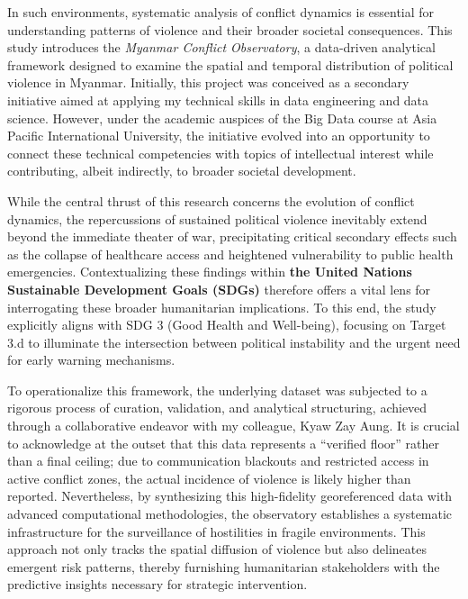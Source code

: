 \documentclass[conference]{IEEEtran}
\begin{document}
In such environments, systematic analysis of conflict dynamics is essential for understanding patterns of violence and their broader societal consequences. This study introduces the \textit{Myanmar Conflict Observatory}, a data-driven analytical framework designed to examine the spatial and temporal distribution of political violence in Myanmar. Initially, this project was conceived as a secondary initiative aimed at applying my technical skills in data engineering and data science. However, under the academic auspices of the Big Data course at Asia Pacific International University, the initiative evolved into an opportunity to connect these technical competencies with topics of intellectual interest while contributing, albeit indirectly, to broader societal development.

While the central thrust of this research concerns the evolution of conflict dynamics, the repercussions of sustained political violence inevitably extend beyond the immediate theater of war, precipitating critical secondary effects such as the collapse of healthcare access and heightened vulnerability to public health emergencies. Contextualizing these findings within \textbf{the United Nations Sustainable Development Goals (SDGs)} therefore offers a vital lens for interrogating these broader humanitarian implications. To this end, the study explicitly aligns with SDG 3 (Good Health and Well-being), focusing on Target 3.d to illuminate the intersection between political instability and the urgent need for early warning mechanisms. 

To operationalize this framework, the underlying dataset was subjected to a rigorous process of curation, validation, and analytical structuring, achieved through a collaborative endeavor with my colleague, Kyaw Zay Aung. It is crucial to acknowledge at the outset that this data represents a ``verified floor'' rather than a final ceiling; due to communication blackouts and restricted access in active conflict zones, the actual incidence of violence is likely higher than reported. Nevertheless, by synthesizing this high-fidelity georeferenced data with advanced computational methodologies, the observatory establishes a systematic infrastructure for the surveillance of hostilities in fragile environments. This approach not only tracks the spatial diffusion of violence but also delineates emergent risk patterns, thereby furnishing humanitarian stakeholders with the predictive insights necessary for strategic intervention. 

\end{document}
